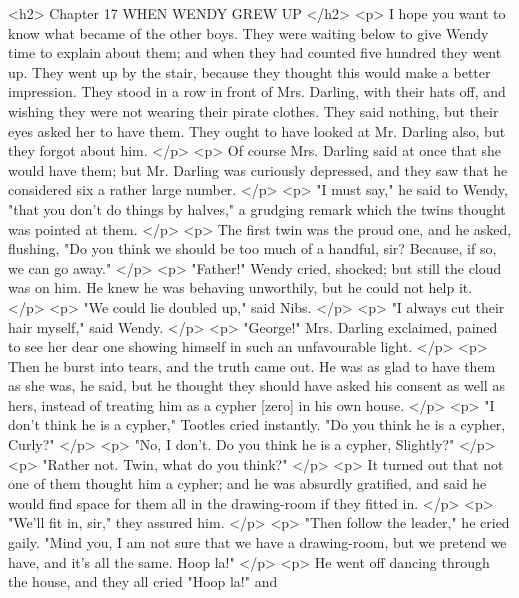     <h2>
      Chapter 17 WHEN WENDY GREW UP
    </h2>
    <p>
      I hope you want to know what became of the other boys. They were waiting
      below to give Wendy time to explain about them; and when they had counted
      five hundred they went up. They went up by the stair, because they thought
      this would make a better impression. They stood in a row in front of Mrs.
      Darling, with their hats off, and wishing they were not wearing their
      pirate clothes. They said nothing, but their eyes asked her to have them.
      They ought to have looked at Mr. Darling also, but they forgot about him.
    </p>
    <p>
      Of course Mrs. Darling said at once that she would have them; but Mr.
      Darling was curiously depressed, and they saw that he considered six a
      rather large number.
    </p>
    <p>
      "I must say," he said to Wendy, "that you don't do things by halves," a
      grudging remark which the twins thought was pointed at them.
    </p>
    <p>
      The first twin was the proud one, and he asked, flushing, "Do you think we
      should be too much of a handful, sir? Because, if so, we can go away."
    </p>
    <p>
      "Father!" Wendy cried, shocked; but still the cloud was on him. He knew he
      was behaving unworthily, but he could not help it.
    </p>
    <p>
      "We could lie doubled up," said Nibs.
    </p>
    <p>
      "I always cut their hair myself," said Wendy.
    </p>
    <p>
      "George!" Mrs. Darling exclaimed, pained to see her dear one showing
      himself in such an unfavourable light.
    </p>
    <p>
      Then he burst into tears, and the truth came out. He was as glad to have
      them as she was, he said, but he thought they should have asked his
      consent as well as hers, instead of treating him as a cypher [zero] in his
      own house.
    </p>
    <p>
      "I don't think he is a cypher," Tootles cried instantly. "Do you think he
      is a cypher, Curly?"
    </p>
    <p>
      "No, I don't. Do you think he is a cypher, Slightly?"
    </p>
    <p>
      "Rather not. Twin, what do you think?"
    </p>
    <p>
      It turned out that not one of them thought him a cypher; and he was
      absurdly gratified, and said he would find space for them all in the
      drawing-room if they fitted in.
    </p>
    <p>
      "We'll fit in, sir," they assured him.
    </p>
    <p>
      "Then follow the leader," he cried gaily. "Mind you, I am not sure that we
      have a drawing-room, but we pretend we have, and it's all the same. Hoop
      la!"
    </p>
    <p>
      He went off dancing through the house, and they all cried "Hoop la!" and
